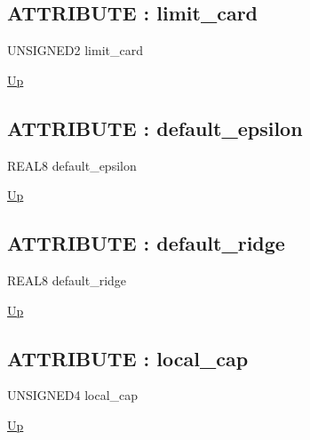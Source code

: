 \subsection*{ATTRIBUTE : limit\_card}
\hypertarget{ecldoc:logisticregression.constants.limit_card}{}
\begin{minipage}[t]{\textwidth}
\begin{flushleft}
UNSIGNED2 limit\_card 
\end{flushleft}
\end{minipage}
\hyperlink{ecldoc:LogisticRegression.Constants}{Up}

\par
\par
\subsection*{ATTRIBUTE : default\_epsilon}
\hypertarget{ecldoc:logisticregression.constants.default_epsilon}{}
\begin{minipage}[t]{\textwidth}
\begin{flushleft}
REAL8 default\_epsilon 
\end{flushleft}
\end{minipage}
\hyperlink{ecldoc:LogisticRegression.Constants}{Up}

\par
\par
\subsection*{ATTRIBUTE : default\_ridge}
\hypertarget{ecldoc:logisticregression.constants.default_ridge}{}
\begin{minipage}[t]{\textwidth}
\begin{flushleft}
REAL8 default\_ridge 
\end{flushleft}
\end{minipage}
\hyperlink{ecldoc:LogisticRegression.Constants}{Up}

\par
\par
\subsection*{ATTRIBUTE : local\_cap}
\hypertarget{ecldoc:logisticregression.constants.local_cap}{}
\begin{minipage}[t]{\textwidth}
\begin{flushleft}
UNSIGNED4 local\_cap 
\end{flushleft}
\end{minipage}
\hyperlink{ecldoc:LogisticRegression.Constants}{Up}

